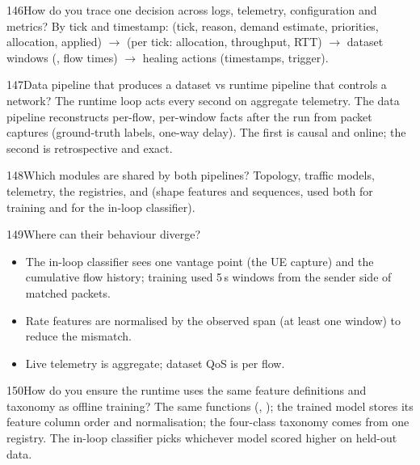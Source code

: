 \begin{qa}{146}{How do you trace one decision across logs, telemetry, configuration and metrics?}
By tick and timestamp:  (tick, reason, demand estimate, priorities, allocation, applied)
$\rightarrow$  (per tick: allocation, throughput, RTT) $\rightarrow$ dataset windows
(, flow times) $\rightarrow$ healing actions (timestamps, trigger).
\end{qa}

\begin{qa}{147}{Data pipeline that produces a dataset vs runtime pipeline that controls a network?}
The runtime loop acts every second on aggregate telemetry. The data pipeline reconstructs per-flow, per-window facts
after the run from packet captures (ground-truth labels, one-way delay). The first is causal and online; the second is
retrospective and exact.
\end{qa}

\begin{qa}{148}{Which modules are shared by both pipelines?}
Topology, traffic models, telemetry, the registries, and  (shape features and sequences, used
both for training and for the in-loop classifier).
\end{qa}

\begin{qa}{149}{Where can their behaviour diverge?}
\begin{itemize}
\item The in-loop classifier sees one vantage point (the UE capture) and the cumulative flow history; training used
5\,s windows from the sender side of matched packets.
\item Rate features are normalised by the observed span (at least one window) to reduce the mismatch.
\item Live telemetry is aggregate; dataset QoS is per flow.
\end{itemize}
\end{qa}

\begin{qa}{150}{How do you ensure the runtime uses the same feature definitions and taxonomy as offline training?}
The same functions (, ); the trained model stores its feature column order
and normalisation; the four-class taxonomy comes from one registry. The in-loop classifier picks whichever model scored
higher on held-out data.
\end{qa}

